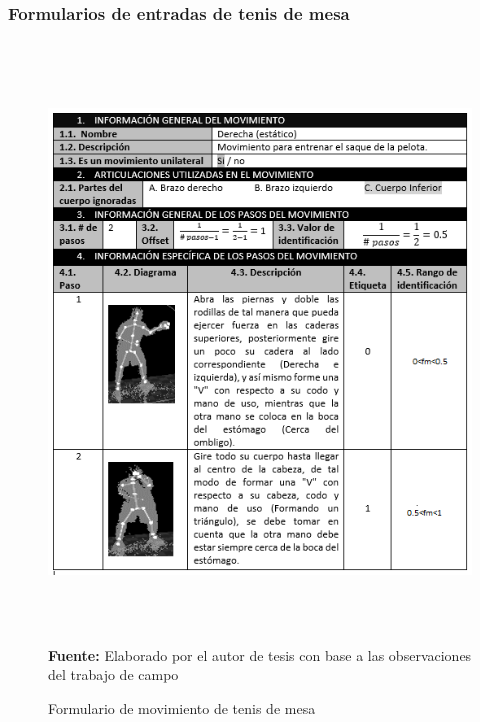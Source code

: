 \subsubsection{Formularios de entradas de tenis de mesa}
\begin{figure}[H]
	\caption{Formulario de movimiento de tenis de mesa}
	\label{fig:frmMovTen}
	\centering	\includegraphics[width=445px,height=600px]{graphics/resultados/movimientoTenis.PNG} \\
	\textbf{Fuente:} Elaborado por el autor de tesis con base a las observaciones del trabajo de campo
\end{figure}

